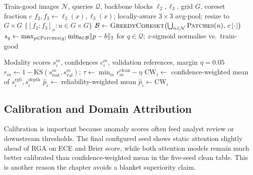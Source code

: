 \documentclass[11pt]{article}
\newcommand{\method}{RGA}
\begin{document}
\begin{algorithm}[H]
\caption{Patch-level PatchCore upstream detector (per modality)}
\label{alg:thesis-patchcore}
\begin{algorithmic}[1]
\Require Train-good images $\mathcal{N}$, queries $\mathcal{Q}$, backbone blocks $\ell_2,\ell_3$, grid $G$, coreset fraction $c$
    \State $f_2,f_3 \gets \ell_2(x),\ell_3(x)$; locally-aware $3{\times}3$ avg-pool; resize to $G{\times}G$
    \State \Return $\{[f_2;f_3]_u : u \in G\times G\}$
\EndFunction
\State $\mathcal{B} \gets \textsc{GreedyCoreset}\bigl(\bigcup_{n\in\mathcal{N}}\textsc{Patches}(n),\, c\,|\!\cdot\!|\bigr)$
\State $s_q \gets \max_{p\in\textsc{Patches}(q)} \min_{b\in\mathcal{B}} \lVert p-b\rVert_2$ for $q\in\mathcal{Q}$; $z$-sigmoid normalise vs.\ train-good
\end{algorithmic}
\end{algorithm}

\begin{algorithm}[H]
\caption{RGA-gated-CW: gate defaults to the strong baseline}
\label{alg:thesis-gated-cw}
\begin{algorithmic}[1]
\Require Modality scores $s^m_i$, confidences $c^m_i$, validation references, margin $\eta=0.05$
\State $r_m \gets 1 - \mathrm{KS}(s^m_{\text{test}}, s^m_{\text{val}})$; \quad $\tau \gets \min_m r^{\text{clean}}_m - \eta$ 
\State $\text{CW}_i \gets$ confidence-weighted mean of $s^{\text{rgb}}_i, s^{\text{depth}}_i$
 \quad $\hat p_i \gets$ reliability-weighted mean 
\Else{} \quad $\hat p_i \gets \text{CW}_i$ 
\EndIf
\end{algorithmic}
\end{algorithm}

\subsection{Calibration and Domain Attribution}

Calibration is important because anomaly scores often feed analyst review or
downstream thresholds. The final configured seed shows static attention slightly
ahead of \method{} on ECE and Brier score, while both attention models remain
much better calibrated than confidence-weighted mean in the five-seed clean
table. This is another reason the chapter avoids a blanket superiority claim.

\begin{table}[H]
\centering
\caption{Calibration and counterfactual domain-attribution summary.}
\label{tab:thesis-calibration-table}
\footnotesize

\end{table}
\end{document}

